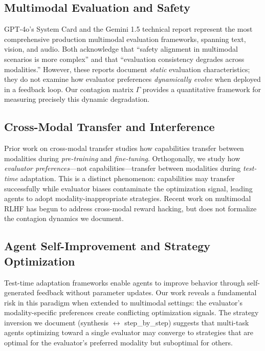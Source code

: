 \documentclass[11pt,a4paper]{article}
\begin{document}
\subsection{Multimodal Evaluation and Safety}

GPT-4o's System Card \cite{openai2024gpt4o} and the Gemini 1.5 technical report \cite{gemini2024gemini15} represent the most comprehensive production multimodal evaluation frameworks, spanning text, vision, and audio. Both acknowledge that ``safety alignment in multimodal scenarios is more complex'' and that ``evaluation consistency degrades across modalities.'' However, these reports document \textit{static} evaluation characteristics; they do not examine how evaluator preferences \textit{dynamically evolve} when deployed in a feedback loop. Our contagion matrix $\Gamma$ provides a quantitative framework for measuring precisely this dynamic degradation.

\subsection{Cross-Modal Transfer and Interference}

Prior work on cross-modal transfer \cite{lu2022multimodal, aghajanyan2021cm3, alayrac2022flamingo} studies how capabilities transfer between modalities during \textit{pre-training} and \textit{fine-tuning}. Orthogonally, we study how \textit{evaluator preferences}---not capabilities---transfer between modalities during \textit{test-time} adaptation. This is a distinct phenomenon: capabilities may transfer successfully while evaluator biases contaminate the optimization signal, leading agents to adopt modality-inappropriate strategies. Recent work on multimodal RLHF \cite{yu2024mmrlhf, sun2024aligning} has begun to address cross-modal reward hacking, but does not formalize the contagion dynamics we document.

\subsection{Agent Self-Improvement and Strategy Optimization}

Test-time adaptation frameworks \cite{shinn2023reflexion, madaan2023selfrefine, yao2023react, wang2024voyager} enable agents to improve behavior through self-generated feedback without parameter updates. Our work reveals a fundamental risk in this paradigm when extended to multimodal settings: the evaluator's modality-specific preferences create conflicting optimization signals. The strategy inversion we document (synthesis $\leftrightarrow$ step\_by\_step) suggests that multi-task agents optimizing toward a single evaluator may converge to strategies that are optimal for the evaluator's preferred modality but suboptimal for others.
\end{document}
